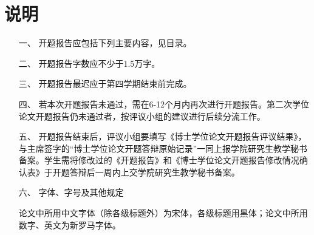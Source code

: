 \documentclass[doctype=proposal,printmode=final]{sysuthesis}
\begin{document}
\frontmatter

\maketitle

\tableofcontents

\mainmatter


\section*{说\hspace*{2\ccwd}明}

\begin{itemize}
    \item[一、]开题报告应包括下列主要内容，见目录。
    \item[二、]开题报告字数应不少于1.5万字。
    \item[三、]开题报告最迟应于第四学期结束前完成。
    \item[四、]若本次开题报告未通过，需在6-12个月内再次进行开题报告。第二次学位论文开题报告仍未通过者，按评议小组的建议进行后续分流工作。
    \item[五、]开题报告结束后，评议小组要填写《博士学位论文开题报告评议结果》，与主席签字的“博士学位论文开题答辩原始记录”一同上报学院研究生教学秘书备案。学生需将修改过的《开题报告》和《博士学位论文开题报告修改情况确认表》于开题答辩后一周内上交学院研究生教学秘书备案。
    \item[六、]字体、字号及其他规定
    
    论文中所用中文字体（除各级标题外）为宋体，各级标题用黑体；论文中所用数字、英文为新罗马字体。


\end{itemize}
\end{document}
